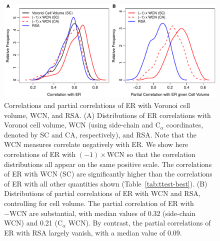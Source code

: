 \documentclass[12pt]{article}
\begin{document}
    \begin{figure}
        \begin{center}
        \includegraphics[width=6.5in]{best_structural_predictors_of_ER_screen.pdf}
        \end{center}
        \caption{Correlations and partial correlations of ER with Voronoi cell volume, WCN, and RSA. (A) Distributions of ER correlations with Voronoi cell volume, WCN (using side-chain and C$_\alpha$  coordinates, denoted by SC and CA, respectively), and RSA. Note that the WCN measures correlate negatively with ER. We show here correlations of ER with $(-1)\times \text{WCN}$ so that the correlation distributions all appear on the same positive scale. The correlations of ER with WCN (SC) are significantly higher than the correlations of ER with all other quantities shown (Table~\ref{tab:ttest-best}). (B) Distributions of partial correlations of ER with WCN and RSA, controlling for cell volume. The partial correlation of ER with $-\text{WCN}$ are substantial, with median values of 0.32 (side-chain WCN) and 0.21 (C$_\alpha$ WCN). By contrast, the partial correlations of ER with RSA largely vanish, with a median value of 0.09.} \label{fig:best_predictorER}
    \end{figure}
\end{document}
